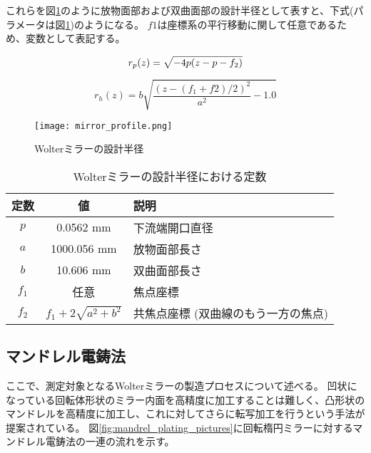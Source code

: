 これらを図\ref{fig:wolter_profile}のように放物面部および双曲面部の設計半径として表すと、下式(パラメータは図\ref{tb:wolter_profile_constants})のようになる。
$f1$は座標系の平行移動に関して任意であるため、変数として表記する。

\begin{equation}
    r_p(z) = \sqrt{ -4p(z - p - f_2) } \\
\end{equation}

\begin{equation}
    r_h(z) = b \sqrt{ \frac{(z - (f_1 + f2) / 2)^2}{a^2} - 1.0 }
\end{equation}

\begin{figure}[h]
\centering
\texttt{[image: mirror\_profile.png]}
\caption{Wolterミラーの設計半径}
\label{fig:wolter_profile}
\end{figure}

\begin{table}[htb]
    \begin{center}
      \begin{tabular}{|c|c|l|} \hline
        定数 & 値 & 説明 \\ \hline
        $p$ & 0.0562 mm & 下流端開口直径 \\
        $a$ & 1000.056 mm & 放物面部長さ \\
        $b$ & 10.606 mm & 双曲面部長さ \\ 
        $f_1$ & 任意 & 焦点座標 \\
        $f_2$ & $f_1 + 2 \sqrt{ a^2 + b^2 }$  & 共焦点座標 (双曲線のもう一方の焦点) \\\hline
      \end{tabular}
      \caption{Wolterミラーの設計半径における定数}
      \label{tb:wolter_profile_constants}
    \end{center}
\end{table}


\subsection{マンドレル電鋳法}
\label{chap1_mirror_mandrel}

ここで、測定対象となるWolterミラーの製造プロセスについて述べる。
凹状になっている回転体形状のミラー内面を高精度に加工することは難しく、凸形状のマンドレルを高精度に加工し、これに対してさらに転写加工を行うという手法が提案されている。\cite{Mimura2018}
図\ref{fig:mandrel_plating_pictures}に回転楕円ミラーに対するマンドレル電鋳法の一連の流れを示す。

